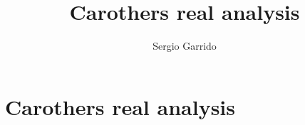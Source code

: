 \documentclass{bookSolutions}
\title{Carothers real analysis}
\author{Sergio Garrido}
\begin{document}
\tableofcontents

\section{Carothers real analysis}

\end{document}

